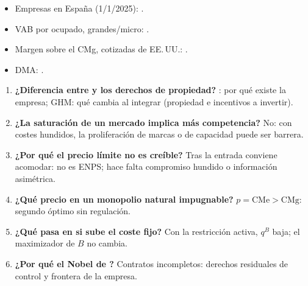 \documentclass{article}
\begin{document}
\begin{columnas}
\anexorepaso
{}
\begin{itemize}
\item Empresas en España (1/1/2025): .
\item VAB por ocupado, grandes/micro: .
\item Margen sobre el CMg, cotizadas de EE.\,UU.: .
\item DMA: .
\end{itemize}
\begin{enumerate}
\item \textbf{¿Diferencia entre  y los derechos de propiedad?} : por qué existe la empresa; GHM: qué cambia al integrar (propiedad e incentivos a invertir).
\item \textbf{¿La saturación de un mercado implica más competencia?} No: con costes hundidos, la proliferación de marcas o de capacidad puede ser barrera.
\item \textbf{¿Por qué el precio límite no es creíble?} Tras la entrada conviene acomodar: no es ENPS; hace falta compromiso hundido o información asimétrica.
\item \textbf{¿Qué precio en un monopolio natural impugnable?} $p=\mathrm{CMe}>\mathrm{CMg}$: segundo óptimo sin regulación.
\item \textbf{¿Qué pasa en  si sube el coste fijo?} Con la restricción activa, $q^B$ baja; el maximizador de $B$ no cambia.
\item \textbf{¿Por qué el Nobel de ?} Contratos incompletos: derechos residuales de control y frontera de la empresa.

\end{enumerate}
\end{columnas}
\end{document}
